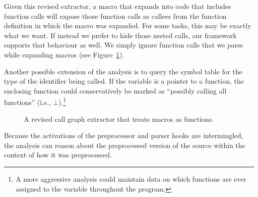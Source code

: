 \documentclass{article}
\newcommand{\ie}{i.e.,}
\begin{document}
\noindent Given this revised extractor, a macro that expands into code
that includes function calls will expose those function calls as callees
from the function definition in which the macro was expanded.  For some
tasks, this may be exactly what we want.  If instead we prefer to hide
those nested calls, our framework supports that behaviour as well.  We
simply ignore function calls that we parse while expanding macros (see
Figure~\ref{fig:rev_call_graph_extractor}).

Another possible extension of the analysis is to query the symbol table
for the type of the identifier being called.  If the variable is a
pointer to a function, the enclosing function could conservatively be
marked as ``possibly calling all functions'' (\ie{} $\bot$).\footnote{A more
aggressive analysis could maintain data on which functions
are ever assigned to the variable throughout the program.}

\begin{figure}[hbt]
\begin{center}
\begin{small}
\end{small}
\caption{A revised call graph extractor that treats macros as functions.}
\label{fig:rev_call_graph_extractor}
\end{center}
\end{figure}

Because the activations of the preprocessor and parser hooks
are intermingled, the analysis can reason about the preprocessed version 
of the source within the context of how it was preprocessed.  
\end{document}
